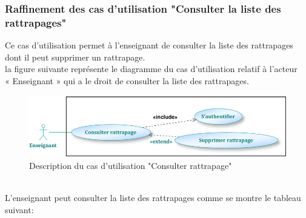 \documentclass[12 pt]{report}
\begin{document}
\subsubsection{Raffinement des cas d’utilisation "Consulter la liste des rattrapages"}
Ce cas d'utilisation permet à l'enseignant de consulter la liste des rattrapages dont il peut 
 supprimer un rattrapage.\\
la figure suivante représente le diagramme du cas d’utilisation  relatif à l’acteur \\« Enseignant » qui a le droit de consulter la liste des rattrapages.
\begin{figure}[h]
\begin{center}
\includegraphics[width= 12cm , height =2.7cm]{enseignant2.png}
\caption{Description du cas d'utilisation "Consulter rattrapage"}
\end{center}
\end{figure}
\\
L'enseignant peut consulter la liste des rattrapages comme se montre le tableau suivant:
\end{document}
